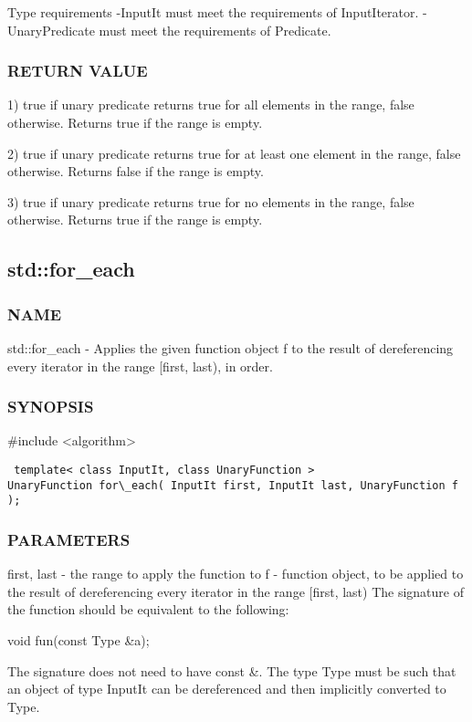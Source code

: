  Type requirements
 -InputIt must meet the requirements of InputIterator.
 -UnaryPredicate must meet the requirements of Predicate.

\subsubsection{RETURN VALUE}
1) true if unary predicate returns true for all elements in the range, false otherwise. Returns true if the range is empty.

2) true if unary predicate returns true for at least one element in the range, false otherwise. Returns false if the range is empty.

3) true if unary predicate returns true for no elements in the range, false otherwise. Returns true if the range is empty.



\subsection{std::for\_each}

\subsubsection{NAME}
std::for\_each - Applies the given function object f to the result of dereferencing every iterator in the range [first, last), in order.

\subsubsection{SYNOPSIS}
\#include <algorithm>

\begin{lstlisting}
 template< class InputIt, class UnaryFunction >
UnaryFunction for\_each( InputIt first, InputIt last, UnaryFunction f );
\end{lstlisting}

\subsubsection{PARAMETERS}
first, last - the range to apply the function to
f - function object,  to be applied to the result of dereferencing every iterator in the range [first, last)
The signature of the function should be equivalent to the following:

 void fun(const Type \&a);

The signature does not need to have const \&. The type Type must be such that an object of type InputIt can be dereferenced and then implicitly converted to Type.


